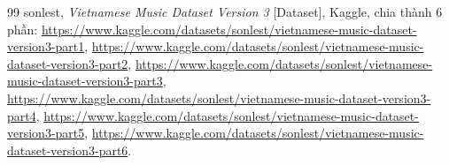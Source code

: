 \documentclass[a4paper,13pt,oneside]{report}
\begin{document}
\begin{thebibliography}{99}
sonlest,
\textit{Vietnamese Music Dataset Version 3} [Dataset], Kaggle, chia thành 6 phần:
\url{https://www.kaggle.com/datasets/sonlest/vietnamese-music-dataset-version3-part1},
\url{https://www.kaggle.com/datasets/sonlest/vietnamese-music-dataset-version3-part2},
\url{https://www.kaggle.com/datasets/sonlest/vietnamese-music-dataset-version3-part3},
\url{https://www.kaggle.com/datasets/sonlest/vietnamese-music-dataset-version3-part4},
\url{https://www.kaggle.com/datasets/sonlest/vietnamese-music-dataset-version3-part5},
\url{https://www.kaggle.com/datasets/sonlest/vietnamese-music-dataset-version3-part6}.


\end{thebibliography}
\end{document}
